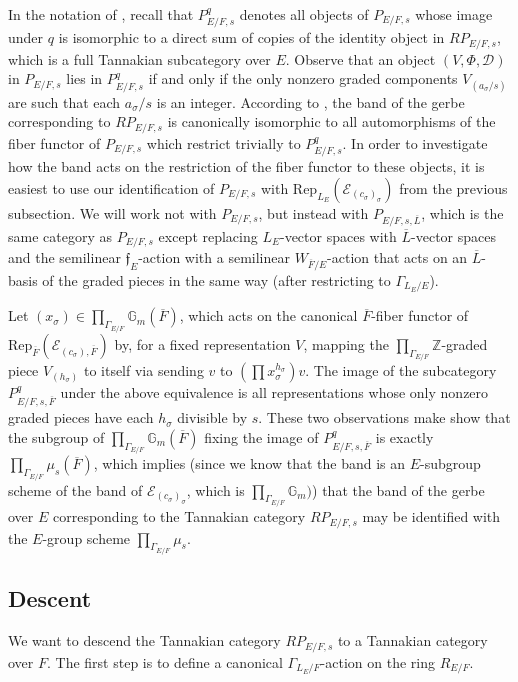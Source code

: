 \documentclass[11pt]{amsart}
\theoremstyle{definition}
\newcommand{\mc}{\mathcal}
\newcommand{\Z}{\mathbb{Z}}
\newcommand{\ov}{\overline}
\newcommand{\mf}{\mathfrak}
\begin{document}
In the notation of \cite[\S 2]{MilneQuot}, recall that $P_{E/F,s}^{q}$ denotes all objects of $P_{E/F,s}$ whose image under $q$ is isomorphic to a direct sum of copies of the identity object in $RP_{E/F, s}$, which is a full Tannakian subcategory over $E$. Observe that an object $(V, \Phi, \mc{D})$ in $P_{E/F,s}$ lies in $P_{E/F,s}^{q}$ if and only if the only nonzero graded components $V_{(a_{\sigma}/s)}$ are such that each $a_{\sigma}/s$ is an integer. According to \cite[\S 2]{MilneQuot}, the band of the gerbe corresponding to $RP_{E/F,s}$ is canonically isomorphic to all automorphisms of the fiber functor of $P_{E/F,s}$ which restrict trivially to $P_{E/F,s}^{q}$. In order to investigate how the band acts on the restriction of the fiber functor to these objects, it is easiest to use our identification of $P_{E/F,s}$ with $\text{Rep}_{L_{E}}(\mc{E}_{(c_{\sigma})_{\sigma}})$ from the previous subsection. We will work not with $P_{E/F,s}$, but instead with $P_{E/F,s,\ov{L}}$, which is the same category as $P_{E/F,s}$ except replacing $L_{E}$-vector spaces with $\ov{L}$-vector spaces and the semilinear $\mf{f}_{E}$-action with a semilinear $W_{\ov{F}/E}$-action that acts on an $\ov{L}$-basis of the graded pieces in the same way (after restricting to $\Gamma_{L_{E}/E}$).

Let $(x_{\sigma}) \in \prod_{\Gamma_{E/F}} \mathbb{G}_{m}(\ov{F})$, which acts on the canonical $\ov{F}$-fiber functor of $\text{Rep}_{\ov{F}}(\mc{E}_{(c_{\sigma}),\ov{F}})$ by, for a fixed representation $V$, mapping the $\prod_{\Gamma_{E/F}}\Z$-graded piece $V_{(h_{\sigma})}$ to itself via sending $v$ to $(\prod x_{\sigma}^{h_{\sigma}})v$. The image of the subcategory $P_{E/F,s,\ov{F}}^{q}$ under the above equivalence is all representations whose only nonzero graded pieces have each $h_{\sigma}$ divisible by $s$. These two observations make show that the subgroup of $\prod_{\Gamma_{E/F}} \mathbb{G}_{m}(\ov{F})$ fixing the image of $P_{E/F,s,\ov{F}}^{q}$ is exactly $\prod_{\Gamma_{E/F}} \mu_{s}(\ov{F})$, which implies (since we know that the band is an $E$-subgroup scheme of the band of $\mc{E}_{(c_{\sigma})_{\sigma}}$, which is $\prod_{\Gamma_{E/F}} \mathbb{G}_{m})$) that the band of the gerbe over $E$ corresponding to the Tannakian category $RP_{E/F,s}$ may be identified with the $E$-group scheme $\prod_{\Gamma_{E/F}} \mu_{s}$.

\subsection{Descent}\label{sec:Descent}
We want to descend the Tannakian category $RP_{E/F,s}$ to a Tannakian category over $F$. The first step is to define a canonical $\Gamma_{L_E/F}$-action on the ring $R_{E/F}$. 
\end{document}
